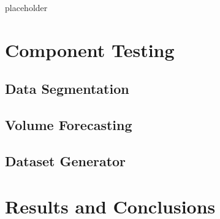 placeholder


\section{Component Testing}

\subsection{Data Segmentation}

\subsection{Volume Forecasting}

\subsection{Dataset Generator}


\section{Results and Conclusions}

